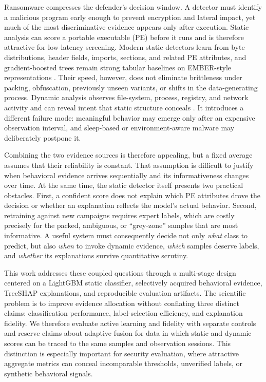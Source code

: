 \documentclass{IEEEtran}
\begin{document}
Ransomware compresses the defender's decision window. A detector must identify a malicious program early enough to prevent encryption and lateral impact, yet much of the most discriminative evidence appears only after execution. Static analysis can score a portable executable (PE) before it runs and is therefore attractive for low-latency screening. Modern static detectors learn from byte distributions, header fields, imports, sections, and related PE attributes, and gradient-boosted trees remain strong tabular baselines on EMBER-style representations \cite{anderson2018ember,harang2020sorel}. Their speed, however, does not eliminate brittleness under packing, obfuscation, previously unseen variants, or shifts in the data-generating process. Dynamic analysis observes file-system, process, registry, and network activity and can reveal intent that static structure conceals \cite{kharraz2015cutting,sgandurra2016automated}. It introduces a different failure mode: meaningful behavior may emerge only after an expensive observation interval, and sleep-based or environment-aware malware may deliberately postpone it.

Combining the two evidence sources is therefore appealing, but a fixed average assumes that their reliability is constant. That assumption is difficult to justify when behavioral evidence arrives sequentially and its informativeness changes over time. At the same time, the static detector itself presents two practical obstacles. First, a confident score does not explain which PE attributes drove the decision or whether an explanation reflects the model's actual behavior. Second, retraining against new campaigns requires expert labels, which are costly precisely for the packed, ambiguous, or ``grey-zone'' samples that are most informative. A useful system must consequently decide not only \emph{what} class to predict, but also \emph{when} to invoke dynamic evidence, \emph{which} samples deserve labels, and \emph{whether} its explanations survive quantitative scrutiny.

This work addresses these coupled questions through a multi-stage design centered on a LightGBM static classifier, selectively acquired behavioral evidence, TreeSHAP explanations, and reproducible evaluation artifacts. The scientific problem is to improve evidence allocation without conflating three distinct claims: classification performance, label-selection efficiency, and explanation fidelity. We therefore evaluate active learning and fidelity with separate controls and reserve claims about adaptive fusion for data in which static and dynamic scores can be traced to the same samples and observation sessions. This distinction is especially important for security evaluation, where attractive aggregate metrics can conceal incomparable thresholds, unverified labels, or synthetic behavioral signals.
\end{document}
